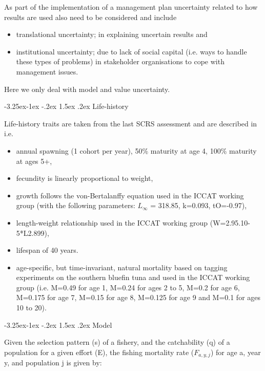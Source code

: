 \documentclass[a4paper, 10pt]{article}
\makeatletter
\renewcommand{\subsection}{\@startsection{subsection}{2}{\z@}%
  {-3.25ex\@plus -1ex \@minus -.2ex}%
  {1.5ex \@plus .2ex}%
  {\normalfont\bfseries\slshape}}
\makeatother
\begin{document}
As part of the implementation of a management plan uncertainty related to how results are used also need to be considered \cite{francis54c} and 
include 

\begin{itemize}
 \item translational uncertainty; in explaining uncertain results and 
 \item institutional uncertainty; due to lack of social capital (i.e. ways to handle these types of problems) in stakeholder organisations 
to cope with management issues. 
\end{itemize}

Here we only deal with model and value uncertainty.

\subsection{Life-history}

Life-history traits are taken from the last SCRS assessment and are described in \cite{kell2012evaluation} i.e.

\begin{itemize}
 \item annual spawning (1 cohort per year), 
50\% maturity at age 4, 100\% maturity at ages 5+, 
 \item fecundity is linearly proportional to weight, 
 \item growth follows the von-Bertalanffy equation used in the ICCAT working group (with the following parameters: $L_{\infty}$ = 318.85, k=0.093, tO=-0.97), 
 \item length-weight relationship used in the ICCAT working group (W=2.95.10-5*L2.899),
 \item lifespan of 40 years.
 \item age-specific, but time-invariant, natural mortality based on tagging experiments on the southern bluefin tuna and used 
 in the ICCAT working group (i.e. M=0.49 for age 1, M=0.24 for ages 2 to 5, M=0.2 for age 6, M=0.175 for age 7, M=0.15 for 
 age 8, M=0.125 for age 9 and M=0.1 for ages 10 to 20).
\end{itemize}

\subsection{Model}

Given the selection pattern (s) of a fishery, and the catchability (q) of a population for a given effort (E), the fishing mortality rate 
($F_{a,y,j}$) for age a, year y, and population j is given by:
\end{document}
